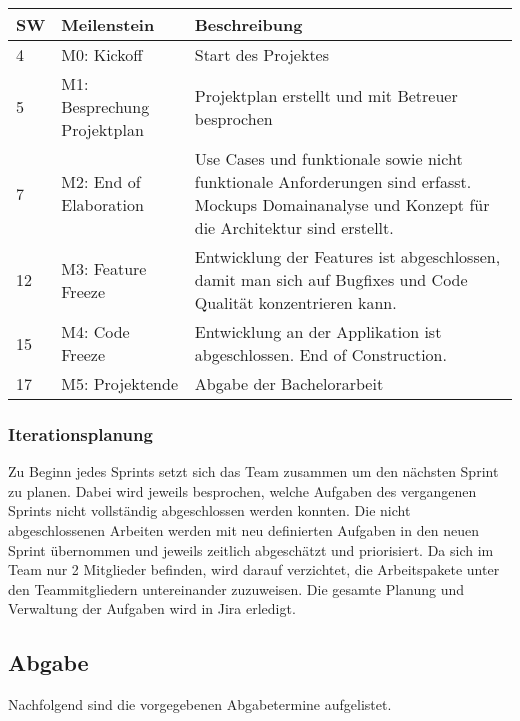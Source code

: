\begin{center}
	\begin{tabularx}{\textwidth}{p{} p{} p{}}
	\toprule
	SW & Meilenstein & Beschreibung \\ \midrule
	4 & M0: Kickoff & Start des Projektes \\ 
	5 & M1: Besprechung Projektplan & Projektplan erstellt und mit Betreuer \newline besprochen \\
	7 & M2: End of Elaboration & Use Cases und funktionale sowie nicht \newline funktionale Anforderungen sind erfasst. \newline Mockups Domainanalyse und Konzept für \newline die Architektur sind erstellt. \\
	12 & M3: Feature Freeze & Entwicklung der Features ist \newline abgeschlossen, damit man sich auf Bugfixes \newline und Code Qualität konzentrieren kann.\\
	15 & M4: Code Freeze & Entwicklung an der Applikation ist \newline abgeschlossen. End of Construction.\\
	17 & M5: Projektende & Abgabe der Bachelorarbeit \\ \bottomrule
	\end{tabularx}
\end{center}

\subsubsection{Iterationsplanung}
Zu Beginn jedes Sprints setzt sich das Team zusammen um den nächsten Sprint zu planen. Dabei wird jeweils besprochen, welche Aufgaben des vergangenen Sprints nicht vollständig abgeschlossen werden konnten. Die nicht abgeschlossenen Arbeiten werden mit neu definierten Aufgaben in den neuen Sprint übernommen und jeweils zeitlich abgeschätzt und priorisiert. Da sich im Team nur 2 Mitglieder befinden, wird darauf verzichtet, die Arbeitspakete unter den Teammitgliedern untereinander zuzuweisen. Die gesamte Planung und Verwaltung der Aufgaben wird in Jira erledigt.

\subsection{Abgabe}
Nachfolgend sind die vorgegebenen Abgabetermine aufgelistet.

